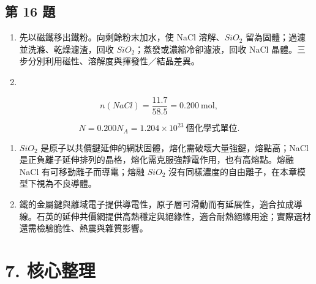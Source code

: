\documentclass[11pt,a4paper]{article}
\providecommand{\tightlist}{%
  \setlength{\itemsep}{0pt}\setlength{\parskip}{0pt}}
\begin{document}
\subsection{第 16 題}\label{ux7b2c-16-ux984c}

\begin{enumerate}
\def\labelenumi{\arabic{enumi}.}
\tightlist
\item
  先以磁鐵移出鐵粉。向剩餘粉末加水，使 NaCl 溶解、\(SiO_2\) 留為固體；過濾並洗滌、乾燥濾渣，回收 \(SiO_2\)；蒸發或濃縮冷卻濾液，回收 NaCl 晶體。三步分別利用磁性、溶解度與揮發性／結晶差異。
\item
\end{enumerate}

\[
n(NaCl)=\frac{11.7}{58.5}=0.200\ \mathrm{mol},
\]

\[
N=0.200N_A=\boxed{1.204\times10^{23}\ \text{個化學式單位}}.
\]

\begin{enumerate}
\def\labelenumi{\arabic{enumi}.}
\setcounter{enumi}{2}
\tightlist
\item
  \(SiO_2\) 是原子以共價鍵延伸的網狀固體，熔化需破壞大量強鍵，熔點高；NaCl 是正負離子延伸排列的晶格，熔化需克服強靜電作用，也有高熔點。熔融 NaCl 有可移動離子而導電；熔融 \(SiO_2\) 沒有同樣濃度的自由離子，在本章模型下視為不良導體。
\item
  鐵的金屬鍵與離域電子提供導電性，原子層可滑動而有延展性，適合拉成導線。石英的延伸共價網提供高熱穩定與絕緣性，適合耐熱絕緣用途；實際選材還需檢驗脆性、熱震與雜質影響。
\end{enumerate}

\clearpage

\section{7. 核心整理}\label{ux6838ux5fc3ux6574ux7406}
\end{document}
